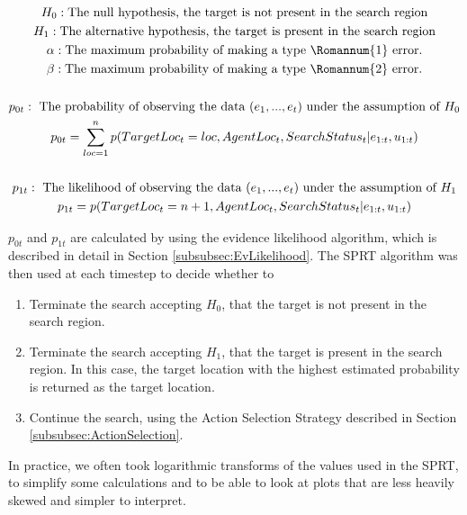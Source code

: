 \begin{gather}\label{eqn:SPRTQuantities}
H_0 : \text{The null hypothesis, the target is not present in the search region}\nonumber
\\ \nonumber
H_1 : \text{The alternative hypothesis, the target is present in the search region}\nonumber
\\ \nonumber
\alpha : \text{The maximum probability of making a type } \Romannum{1} \text{ error.} \nonumber
\\ \nonumber
\beta : \text{The maximum probability of making a type } \Romannum{2} \text{ error.}\nonumber
\\ \nonumber
\\ \nonumber
p_{0t} : \text{ The probability of observing the data $(e_1, ..., e_t)$ under the assumption of $H_0$} \nonumber
\\ \nonumber
p_{0t}=\sum_{loc=1}^{n} p(TargetLoc_t = loc, AgentLoc_t, SearchStatus_t| e_{1:t}, u_{1:t})\nonumber
\\ \nonumber
\\ \nonumber
p_{1t} : \text{ The likelihood of observing the data $(e_1, ..., e_t)$ under the assumption of $H_1$} \nonumber
\\ \nonumber
p_{1t}=p(TargetLoc_t = n+1, AgentLoc_t, SearchStatus_t | e_{1:t}, u_{1:t})\nonumber 
\end{gather}

$p_{0t}$ and $p_{1t}$ are calculated by using the evidence likelihood algorithm, which is described in detail in Section \ref{subsubsec:EvLikelihood}. The SPRT algorithm was then used at each timestep to decide whether to 
\begin{enumerate}
    \item Terminate the search accepting $H_0$, that the target is not present in the search region.
    \item Terminate the search accepting $H_1$, that the target is present in the search region. In this case, the target location with the highest estimated probability is returned as the target location.
    \item Continue the search, using the Action Selection Strategy described in Section \ref{subsubsec:ActionSelection}.
\end{enumerate}
In practice, we often took logarithmic transforms of the values used in the SPRT, to simplify some calculations and to be able to look at plots that are less heavily skewed and simpler to interpret.

